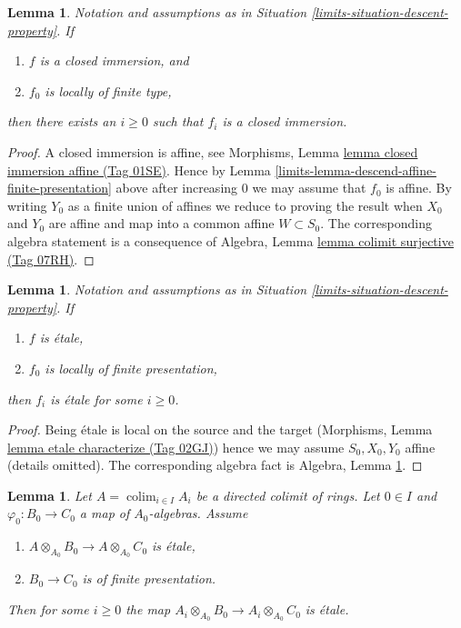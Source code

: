 \documentclass{amsart}
\theoremstyle{plain}
\newtheorem{lemma}[subsection]{Lemma}
\theoremstyle{definition}
\theoremstyle{remark}
\numberwithin{equation}{subsection}
\def\colim{\mathop{\mathrm{colim}}\nolimits}
\begin{document}
\begin{lemma}
\label{limits-lemma-descend-closed-immersion-finite-presentation}
Notation and assumptions as in Situation \ref{limits-situation-descent-property}.
If
\begin{enumerate}
\item $f$ is a closed immersion, and
\item $f_0$ is locally of finite type,
\end{enumerate}
then there exists an $i \geq 0$ such that $f_i$ is a closed immersion.
\end{lemma}

\begin{proof}
A closed immersion is affine, see
Morphisms, Lemma \href{https://stacks.math.columbia.edu/tag/01SE}{lemma closed immersion affine (Tag 01SE)}.
Hence by Lemma \ref{limits-lemma-descend-affine-finite-presentation} above
after increasing $0$ we may assume that $f_0$ is affine.
By writing $Y_0$ as a finite union of affines we reduce to proving
the result when $X_0$ and $Y_0$ are affine and map
into a common affine $W \subset S_0$. The corresponding algebra
statement is a consequence of
Algebra, Lemma \href{https://stacks.math.columbia.edu/tag/07RH}{lemma colimit surjective (Tag 07RH)}.
\end{proof}


\begin{lemma}
\label{limits-lemma-descend-etale}
Notation and assumptions as in Situation \ref{limits-situation-descent-property}.
If
\begin{enumerate}
\item $f$ is \'etale,
\item $f_0$ is locally of finite presentation,
\end{enumerate}
then $f_i$ is \'etale for some $i \geq 0$.
\end{lemma}

\begin{proof}
Being \'etale is local on the source and the target (Morphisms,
Lemma \href{https://stacks.math.columbia.edu/tag/02GJ}{lemma etale characterize (Tag 02GJ)}) hence we may assume
$S_0, X_0, Y_0$ affine (details omitted). The corresponding algebra fact is
Algebra, Lemma \ref{algebra-lemma-colimit-etale}.
\end{proof}


\begin{lemma}
\label{algebra-lemma-colimit-etale}
Let $A = \colim_{i \in I} A_i$ be a directed colimit of rings.
Let $0 \in I$ and $\varphi_0 : B_0 \to C_0$ a map of $A_0$-algebras.
Assume
\begin{enumerate}
\item $A \otimes_{A_0} B_0 \to A \otimes_{A_0} C_0$ is \'etale,
\item $B_0 \to C_0$ is of finite presentation.
\end{enumerate}
Then for some $i \geq 0$ the map
$A_i \otimes_{A_0} B_0 \to A_i \otimes_{A_0} C_0$
is \'etale.
\end{lemma}
\end{document}
